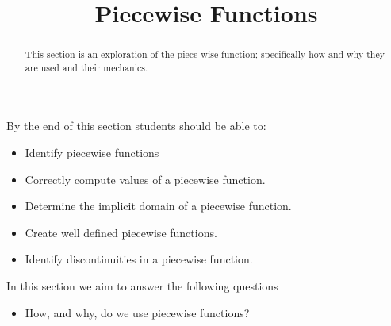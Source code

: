 \documentclass{ximeraXloud}
\title{Piecewise Functions}
\begin{document}
\begin{abstract}
    This section is an exploration of the piece-wise function; specifically how and why they are used and their mechanics.
\end{abstract}
\maketitle
By the end of this section students should be able to:

\begin{itemize}
    \item Identify piecewise functions
    \item Correctly compute values of a piecewise function.
    \item Determine the implicit domain of a piecewise function.
    \item Create well defined piecewise functions.
    \item Identify discontinuities in a piecewise function.
\end{itemize}


In this section we aim to answer the following questions

\begin{itemize}
    \item How, and why, do we use piecewise functions?
\end{itemize}
\end{document}

